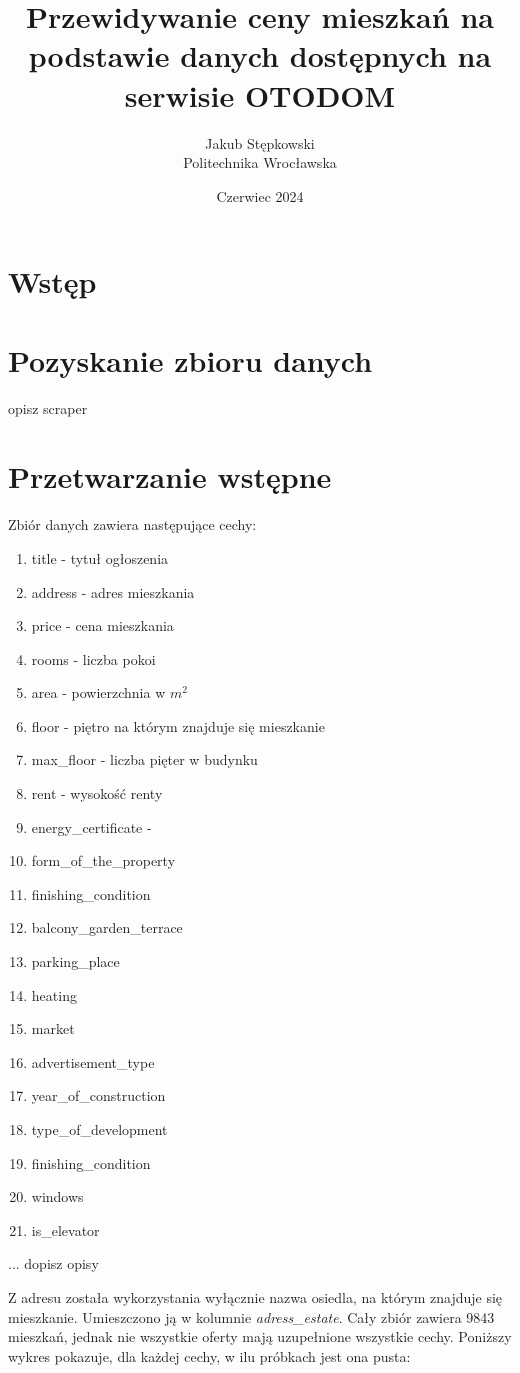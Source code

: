 \documentclass{article}
\title{Przewidywanie ceny mieszkań na podstawie danych dostępnych na serwisie OTODOM}
\author{Jakub Stępkowski\\Politechnika Wrocławska }
\date{Czerwiec 2024}
\begin{document}
\maketitle

\section{Wstęp}
\section{Pozyskanie zbioru danych}
opisz scraper
\section{Przetwarzanie wstępne}
Zbiór danych zawiera następujące cechy:
\begin{enumerate}
    \item title - tytuł ogłoszenia
    \item address - adres mieszkania
    \item price - cena mieszkania
    \item rooms - liczba pokoi
    \item area - powierzchnia w $m^2$
    \item floor - piętro na którym znajduje się mieszkanie
    \item max\_floor - liczba pięter w budynku
    \item rent - wysokość renty
    \item energy\_certificate - 
    \item form\_of\_the\_property
    \item finishing\_condition
    \item balcony\_garden\_terrace
    \item parking\_place
    \item heating
    \item market
    \item advertisement\_type
    \item year\_of\_construction
    \item type\_of\_development
    \item finishing\_condition
    \item windows
    \item is\_elevator
\end{enumerate}
... dopisz opisy

Z adresu została wykorzystania wyłącznie nazwa osiedla, na którym znajduje się mieszkanie. Umieszczono ją w kolumnie \textit{adress\_estate}.
Cały zbiór zawiera 9843 mieszkań, jednak nie wszystkie oferty mają uzupełnione wszystkie cechy. Poniższy wykres pokazuje, dla każdej cechy, w ilu próbkach jest ona pusta:
\end{document}

